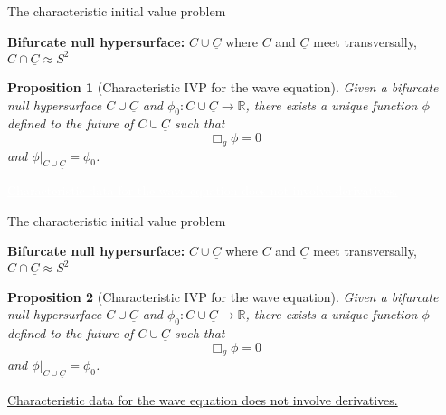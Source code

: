 \documentclass[compress,usenames,dvipsnames,8pt]{beamer}
\newtheorem*{prop}{Proposition}
\theoremstyle{definition}
\renewcommand{\(}{\begin{columns}}
\renewcommand{\)}{\end{columns}}
\newcommand{\<}[1]{\begin{column}{#1}}
\renewcommand{\>}{\end{column}}
\begin{document}
\begin{frame}{The characteristic initial value problem}

\textbf{Bifurcate null hypersurface:} $C\cup\underline C$ where $C$ and $\underline C$ meet transversally, $C\cap \underline C \approx S^2$ 
\begin{prop}[Characteristic IVP for the wave equation]
Given a bifurcate null hypersurface $C\cup\underline C$ and $\phi_0:C\cup \underline C\to\mathbb R$, there exists a unique function $\phi$ defined to the future of $C\cup \underline C$ such that 
\[\Box_g \phi =0 \tag{$*$}\]
and $\phi|_{C\cup \underline C}= \phi_0$. 
\end{prop}

\addtocounter{framenumber}{-1}

\begin{figure}
 \def\svgwidth{10pc}

\end{figure}



\begin{center}
\textcolor{white}{\underline{Characteristic data for the wave equation does not involve derivatives.}}
\end{center}
\end{frame}

\begin{frame}{The characteristic initial value problem}

\textbf{Bifurcate null hypersurface:} $C\cup\underline C$ where $C$ and $\underline C$ meet transversally, $C\cap \underline C \approx S^2$ 
\begin{prop}[Characteristic IVP for the wave equation]
Given a bifurcate null hypersurface $C\cup\underline C$ and $\phi_0:C\cup \underline C\to\mathbb R$, there exists a unique function $\phi$ defined to the future of $C\cup \underline C$ such that 
\[\Box_g \phi =0 \tag{$*$}\]
and $\phi|_{C\cup \underline C}= \phi_0$. 
\end{prop}

\addtocounter{framenumber}{-1}

\begin{figure}
 \def\svgwidth{10pc}

\end{figure}



\begin{center}
\underline{Characteristic data for the wave equation does not involve derivatives.}
\end{center}
\end{frame}
\end{document}
